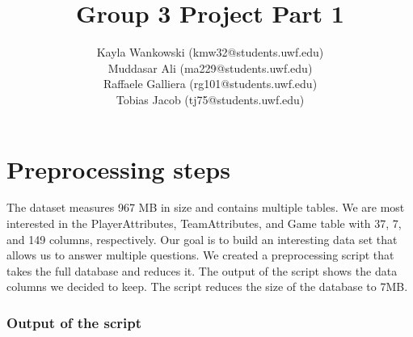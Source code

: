 \documentclass{article}
\begin{document}
\title{Group 3 Project Part 1}
\author{
    Kayla Wankowski (kmw32@students.uwf.edu)\\
    Muddasar Ali (ma229@students.uwf.edu)\\
    Raffaele Galliera (rg101@students.uwf.edu)\\
    Tobias Jacob (tj75@students.uwf.edu)
}

\maketitle

\section{Preprocessing steps}
The dataset measures 967 MB in size and contains multiple tables.
We are most interested in the PlayerAttributes, TeamAttributes, and Game table with 37, 7, and 149 columns, respectively.
Our goal is to build an interesting data set that allows us to answer multiple questions.
We created a preprocessing script that takes the full database and reduces it.
The output of the script shows the data columns we decided to keep.
The script reduces the size of the database to 7MB.

\subsubsection*{Output of the script}
\end{document}
